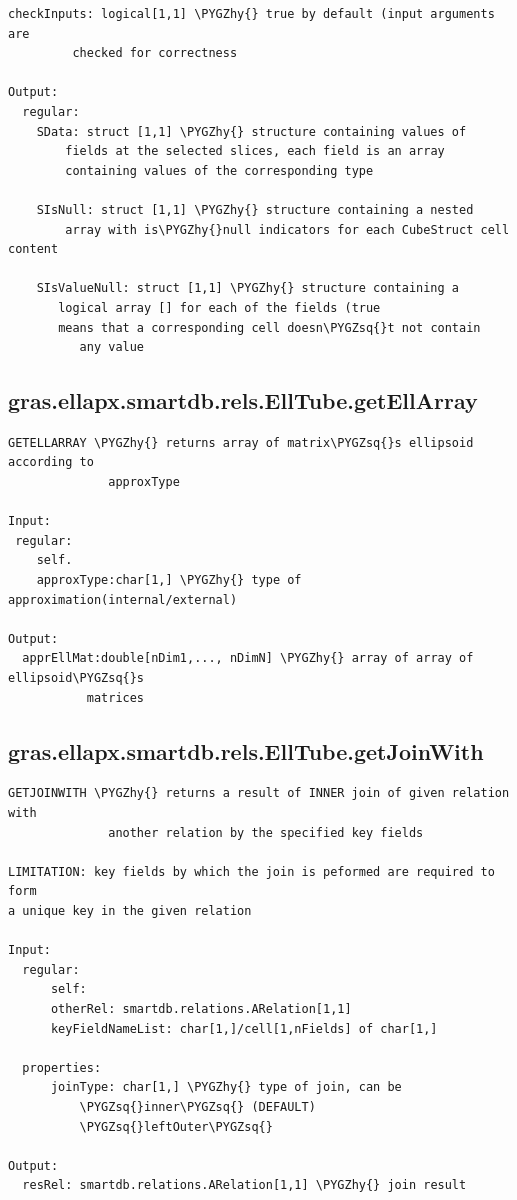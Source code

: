 \documentclass[letterpaper,10pt,english]{sphinxmanual}
\def\PYGZhy{\char`\-}
\def\PYGZsq{\char`\'}
\begin{document}
\begin{Verbatim}[commandchars=\\\{\}]
      checkInputs: logical[1,1] \PYGZhy{} true by default (input arguments are
         checked for correctness

Output:
  regular:
    SData: struct [1,1] \PYGZhy{} structure containing values of
        fields at the selected slices, each field is an array
        containing values of the corresponding type

    SIsNull: struct [1,1] \PYGZhy{} structure containing a nested
        array with is\PYGZhy{}null indicators for each CubeStruct cell content

    SIsValueNull: struct [1,1] \PYGZhy{} structure containing a
       logical array [] for each of the fields (true
       means that a corresponding cell doesn\PYGZsq{}t not contain
          any value
\end{Verbatim}


\subsection{gras.ellapx.smartdb.rels.EllTube.getEllArray}
\label{chap_functions:gras-ellapx-smartdb-rels-elltube-getellarray}
\begin{Verbatim}[commandchars=\\\{\}]
GETELLARRAY \PYGZhy{} returns array of matrix\PYGZsq{}s ellipsoid according to
              approxType

Input:
 regular:
    self.
    approxType:char[1,] \PYGZhy{} type of approximation(internal/external)

Output:
  apprEllMat:double[nDim1,..., nDimN] \PYGZhy{} array of array of ellipsoid\PYGZsq{}s
           matrices
\end{Verbatim}


\subsection{gras.ellapx.smartdb.rels.EllTube.getJoinWith}
\label{chap_functions:gras-ellapx-smartdb-rels-elltube-getjoinwith}
\begin{Verbatim}[commandchars=\\\{\}]
GETJOINWITH \PYGZhy{} returns a result of INNER join of given relation with
              another relation by the specified key fields

LIMITATION: key fields by which the join is peformed are required to form
a unique key in the given relation

Input:
  regular:
      self:
      otherRel: smartdb.relations.ARelation[1,1]
      keyFieldNameList: char[1,]/cell[1,nFields] of char[1,]

  properties:
      joinType: char[1,] \PYGZhy{} type of join, can be
          \PYGZsq{}inner\PYGZsq{} (DEFAULT)
          \PYGZsq{}leftOuter\PYGZsq{}

Output:
  resRel: smartdb.relations.ARelation[1,1] \PYGZhy{} join result
\end{Verbatim}
\end{document}
